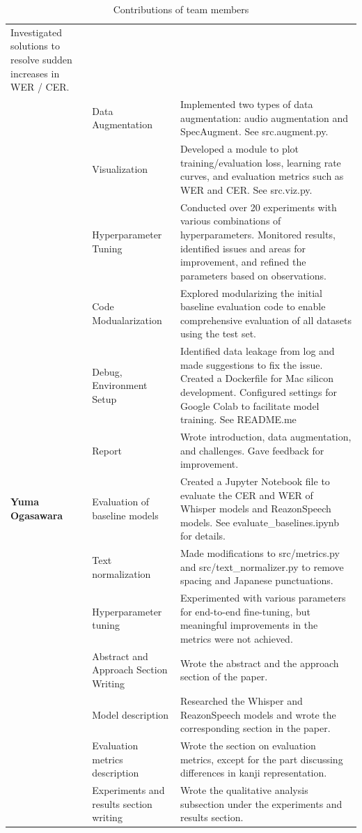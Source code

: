 \documentclass[10pt,twocolumn,letterpaper]{article}
\begin{document}
\begin{table}
\begin{tabular}{|p{2cm}|p{2.9cm}|p{13cm}|}
Investigated solutions to resolve sudden increases in WER / CER. \\
\cline{2-3}
                 & Data Augmentation & Implemented two types of data augmentation: audio augmentation and SpecAugment. See src.augment.py.  \\
\cline{2-3}
                 & Visualization & Developed a module to plot training/evaluation loss, learning rate curves, and evaluation metrics such as WER and CER. See src.viz.py.  \\
\cline{2-3}
                 & Hyperparameter Tuning & Conducted over 20 experiments with various combinations of hyperparameters. Monitored results, identified issues and areas for improvement, and refined the parameters based on observations.  \\
\cline{2-3}
                 & Code Modualarization & Explored modularizing the initial baseline evaluation code to enable comprehensive evaluation of all datasets using the test set.  \\
\cline{2-3}
                 & Debug, Environment Setup & Identified data leakage from log and made suggestions to fix the issue. Created a Dockerfile for Mac silicon development. Configured settings for Google Colab to facilitate model training. See README.me \\
\cline{2-3}
                 & Report & Wrote introduction, data augmentation, and challenges. Gave feedback for improvement. \\
\hline
\textbf{Yuma Ogasawara}  & Evaluation of baseline models & Created a Jupyter Notebook file to evaluate the CER and WER of Whisper models and ReazonSpeech models. See evaluate\_baselines.ipynb for details. \\
\cline{2-3}
                 & Text normalization & Made modifications to src/metrics.py and src/text\_normalizer.py to remove spacing and Japanese punctuations. \\
\cline{2-3}
                 & Hyperparameter tuning & Experimented with various parameters for end-to-end fine-tuning, but meaningful improvements in the metrics were not achieved. \\
\cline{2-3}
                 & Abstract and Approach Section Writing & Wrote the abstract and the approach section of the paper.\\
\cline{2-3}
                 & Model description & Researched the Whisper and ReazonSpeech models and wrote the corresponding section in the paper. \\
\cline{2-3}
                 & Evaluation metrics description & Wrote the section on evaluation metrics, except for the part discussing differences in kanji representation. \\
\cline{2-3}
                 & Experiments and results section writing & Wrote the qualitative analysis subsection under the experiments and results section. \\
\hline
\end{tabular}
\caption{Contributions of team members}
\end{table}
\end{document}
